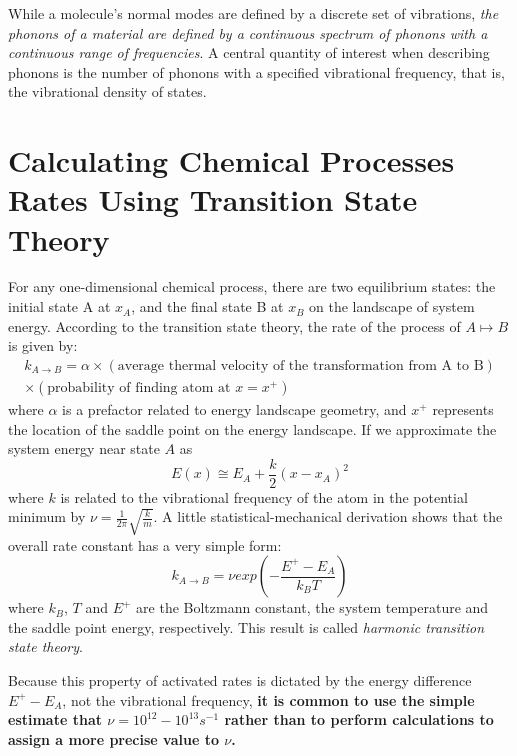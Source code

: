 \documentclass[12pt]{article}
\begin{document}
While a molecule’s normal modes are defined by a discrete set of vibrations, \emph{the phonons of a material are defined by a continuous spectrum of phonons with a continuous range of frequencies}. A central quantity of interest when describing phonons is the number of phonons with a specified vibrational frequency, that is, the vibrational density of states.

\section{Calculating Chemical Processes Rates Using Transition State Theory}
For any one-dimensional chemical process, there are two equilibrium states: the initial state A at $x_A$, and the final state B at $x_B$ on the landscape of system energy. According to the transition state theory, the rate of the process of $A\mapsto B$ is given by:
\begin{equation}
\begin{split}
k_{A\rightarrow B} = \alpha \times (\text{average thermal velocity of the transformation from A to B})\\
 \times (\text{probability of finding atom at } x=x^+)
\end{split}
\end{equation}
where $\alpha$ is a prefactor related to energy landscape geometry, and $x^+$ represents the location of the saddle point on the energy landscape. If we approximate the system energy near state $A$ as 
\begin{equation}
    E(x)\cong E_A+\frac{k}{2}(x-x_A)^2
\end{equation}
where $k$ is related to the vibrational frequency of the atom in the potential minimum by $\nu=\frac{1}{2\pi}\sqrt{\frac{k}{m}}$. A little statistical-mechanical derivation shows that the overall rate constant has a very simple form:
\begin{equation}
    k_{A\rightarrow B} = \nu exp(-\frac{E^+-E_A}{k_BT})
\end{equation}
where $k_B$, $T$ and $E^+$ are the Boltzmann constant, the system temperature and the saddle point energy, respectively. This result is called \emph{harmonic transition state theory}.

Because this property of activated rates is dictated by
the energy difference $E^+-E_A$, not the vibrational frequency, \textbf{it is common to use the simple estimate that $\nu=10^{12}-10^{13} s^{-1}$ rather than to perform calculations to assign a more
precise value to $\nu$.}
\end{document}
